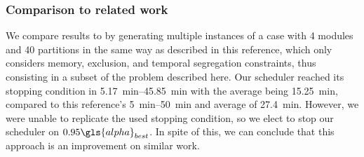 \documentclass[main.tex]{subfiles}
\begin{document}
\subsubsection{Comparison to related work}

We compare results to \textcite{al2012strictly} by generating multiple instances of a case with \num{4} modules and \num{40} partitions in the same way as described in this reference, which only considers memory, exclusion, and temporal segregation constraints, thus consisting in a subset of the problem described here.
Our scheduler reached its stopping condition in \SIrange{5.17}{45.85}{\minute} with the average being \SI{15.25}{\minute}, compared to this reference's \SIrange{5}{50}{\minute} and average of \SI{27.4}{\minute}.
However, we were unable to replicate the used stopping condition, so we elect to stop our scheduler on $0.95\gls{alpha}_{best}$.
In spite of this, we can conclude that this approach is an improvement on similar work.
\end{document}
